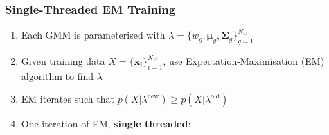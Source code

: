 \documentclass[usenames,dvipsnames]{beamer}
\def\Vec#1{{\boldsymbol{#1}}}
\def\Mat#1{{\boldsymbol{#1}}}
\begin{document}
\begin{frame}
\frametitle{Single-Threaded EM Training}

\begin{enumerate}[{~~$\boldsymbol{\bullet}$}]
\renewcommand{\itemsep}{1ex}

\item Each GMM is parameterised with $\lambda = \{ w_g, \Vec{\mu}_g, \Mat{\Sigma}_g \}_{g=1}^{N_G}$

\item Given training data $X=\{\Vec{x}_i\}_{i=1}^{N_V}$, use Expectation-Maximisation (EM) algorithm to find $\lambda$

\item EM iterates such that $p(X|\lambda^{\textrm{new}}) \geq p(X|\lambda^{\textrm{old}})$

\item One iteration of EM, {\bf single threaded}:

\begin{minipage}{1\textwidth}


\end{minipage}
\end{enumerate}
\end{frame}
\end{document}
